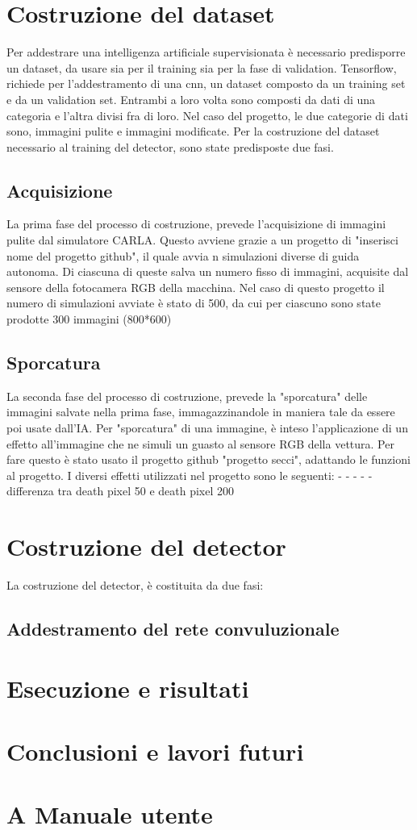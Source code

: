 \documentclass[14pt]{extarticle}
\begin{document}
\section{Costruzione del dataset}
Per addestrare una intelligenza artificiale supervisionata è necessario predisporre un dataset, da usare sia per il training sia per la fase di validation.
Tensorflow, richiede per l'addestramento di una cnn, un dataset composto da un training set e da un validation set. Entrambi a loro volta sono composti da dati di una categoria e l'altra divisi fra di loro. Nel caso del progetto, le due categorie di dati sono, immagini pulite e immagini modificate.
Per la costruzione del dataset necessario al training del detector, sono state predisposte due fasi.


\subsection{Acquisizione}
La prima fase del processo di costruzione, prevede l'acquisizione di immagini pulite dal simulatore CARLA. Questo avviene grazie a un progetto di "inserisci nome del progetto github", il quale avvia n simulazioni diverse di guida autonoma. Di ciascuna di queste salva un numero fisso di immagini, acquisite dal sensore della fotocamera RGB della macchina.
Nel caso di questo progetto il numero di simulazioni avviate è stato di 500, da cui per ciascuno sono state prodotte 300 immagini (800*600)
\subsection{Sporcatura}
La seconda fase del processo di costruzione, prevede la "sporcatura" delle immagini salvate nella prima fase, immagazzinandole in maniera tale da essere poi usate dall'IA.
Per "sporcatura" di una immagine, è inteso l'applicazione di un effetto all'immagine che ne simuli un guasto al sensore RGB della vettura.
Per fare questo è stato usato il progetto github "progetto secci", adattando le funzioni al progetto.
I diversi effetti utilizzati nel progetto sono le seguenti:
-
-
-
-
-
differenza tra death pixel 50 e death pixel 200 

\section{Costruzione del detector}
La costruzione del detector, è costituita da due fasi:
\subsection{Addestramento del rete convuluzionale}




\section{Esecuzione e risultati}

\section{Conclusioni e lavori futuri}

\section{A Manuale utente}

\newpage
\printbibliography
\end{document}
